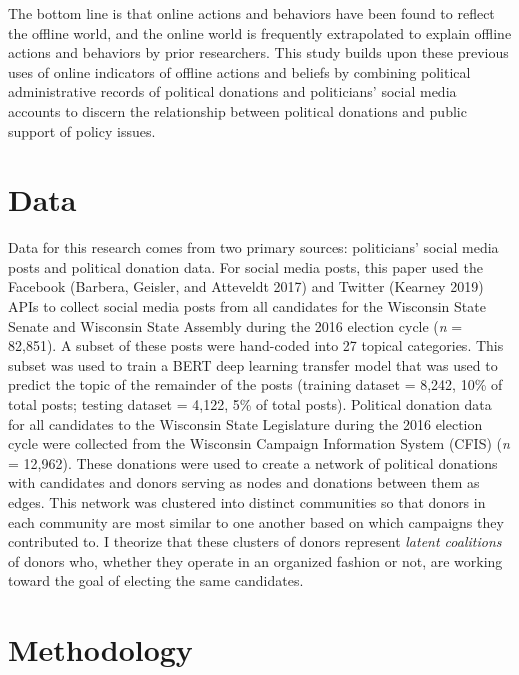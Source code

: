 \documentclass[12pt,]{article}
\begin{document}
The bottom line is that online actions and behaviors have been found to
reflect the offline world, and the online world is frequently
extrapolated to explain offline actions and behaviors by prior
researchers. This study builds upon these previous uses of online
indicators of offline actions and beliefs by combining political
administrative records of political donations and politicians' social
media accounts to discern the relationship between political donations
and public support of policy issues.

\hypertarget{data}{%
\section{Data}\label{data}}

Data for this research comes from two primary sources: politicians'
social media posts and political donation data. For social media posts,
this paper used the Facebook (Barbera, Geisler, and Atteveldt 2017) and
Twitter (Kearney 2019) APIs to collect social media posts from all
candidates for the Wisconsin State Senate and Wisconsin State Assembly
during the 2016 election cycle (\emph{n} = 82,851). A subset of these
posts were hand-coded into 27 topical categories. This subset was used
to train a BERT deep learning transfer model that was used to predict
the topic of the remainder of the posts (training dataset = 8,242, 10\%
of total posts; testing dataset = 4,122, 5\% of total posts). Political
donation data for all candidates to the Wisconsin State Legislature
during the 2016 election cycle were collected from the Wisconsin
Campaign Information System (CFIS) (\emph{n} = 12,962). These donations
were used to create a network of political donations with candidates and
donors serving as nodes and donations between them as edges. This
network was clustered into distinct communities so that donors in each
community are most similar to one another based on which campaigns they
contributed to. I theorize that these clusters of donors represent
\emph{latent coalitions} of donors who, whether they operate in an
organized fashion or not, are working toward the goal of electing the
same candidates.

\hypertarget{methodology}{%
\section{Methodology}\label{methodology}}
\end{document}
